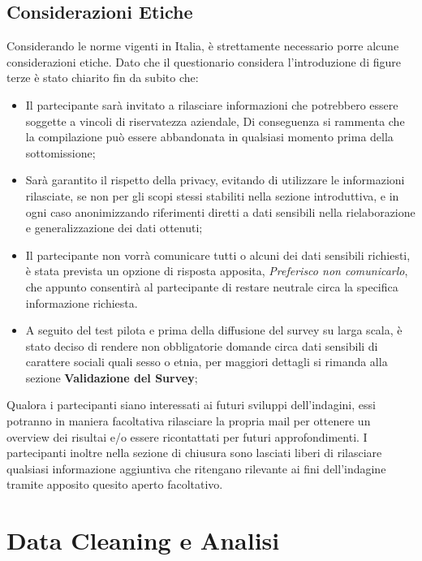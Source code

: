     \subsection{Considerazioni Etiche}
    
    Considerando le norme vigenti in Italia, è strettamente necessario porre alcune considerazioni etiche.
    Dato che il questionario considera l'introduzione di figure terze è stato chiarito fin da subito che:
    \begin{itemize}
        \item  Il partecipante sarà invitato a rilasciare informazioni che potrebbero essere soggette a vincoli di riservatezza aziendale, Di conseguenza si rammenta che la compilazione può essere abbandonata in qualsiasi momento prima della sottomissione;
        \item Sarà garantito il rispetto della privacy, evitando di utilizzare le informazioni rilasciate, se non per gli scopi stessi stabiliti nella sezione introduttiva, e in ogni caso anonimizzando  riferimenti diretti a dati sensibili nella rielaborazione e generalizzazione dei dati ottenuti;
        \item Il partecipante non vorrà comunicare tutti o alcuni dei dati sensibili richiesti, è stata prevista un opzione di risposta apposita, \emph{Preferisco non comunicarlo}, che appunto consentirà al partecipante di restare neutrale circa la specifica informazione richiesta.
        \item A seguito del test pilota e prima della diffusione del survey su larga scala, è stato deciso di rendere non obbligatorie domande circa dati sensibili di carattere sociali quali sesso o etnia, per maggiori dettagli si rimanda alla sezione \textbf{Validazione del Survey};
    \end{itemize}
    
    Qualora i partecipanti siano interessati ai futuri sviluppi dell'indagini, essi potranno in maniera facoltativa rilasciare la propria mail per ottenere un overview dei risultai e/o essere ricontattati per futuri approfondimenti. I partecipanti inoltre nella sezione di chiusura sono lasciati liberi di rilasciare qualsiasi informazione aggiuntiva che ritengano rilevante ai fini dell'indagine tramite apposito quesito aperto facoltativo.
    
    \section{Data Cleaning e Analisi}
    
